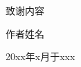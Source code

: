 \cleardoublepage
{}
{%
}
{%
    致谢内容

    \begin{flushright}
        \vspace*{\fill}
        作者姓名

        20xx年x月于xxx
    \end{flushright}
}